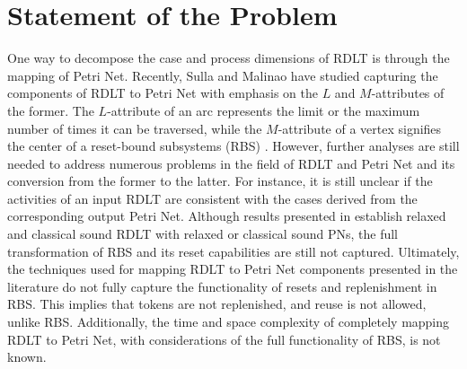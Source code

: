 \section{Statement of the Problem}
One way to decompose the case and process dimensions of RDLT is through the mapping of Petri Net. Recently, Sulla and Malinao \cite{sulla-malinao} have studied capturing the components of RDLT to Petri Net with emphasis on the $L$ and $M$-attributes of the former. The $L$-attribute of an arc represents the limit or the maximum number of times it can be traversed, while the $M$-attribute of a vertex signifies the center of a reset-bound subsystems (RBS) \cite{sulla-malinao}. However, further analyses are still needed to address numerous problems in the field of RDLT and Petri Net and its conversion from the former to the latter. For instance, it is still unclear if the activities of an input RDLT are consistent with the cases derived from the corresponding output Petri Net. Although results presented in \cite{sulla-malinao} establish relaxed and classical sound RDLT with relaxed or classical sound PNs, the full transformation of RBS and its reset capabilities are still not captured. Ultimately, the techniques used for mapping RDLT to Petri Net components presented in the literature do not fully capture the functionality of resets and replenishment in RBS. This implies that tokens are not replenished, and reuse is not allowed, unlike RBS. Additionally, the time and space complexity of completely mapping RDLT to Petri Net, with considerations of the full functionality of RBS, is not known.

